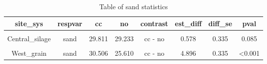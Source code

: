 \documentclass[
]{article}
\begin{document}
\begin{table}[H]

\caption{\label{tab:texture2}Table of sand statistics}
\centering
\begin{tabular}[t]{cccccccc}
\toprule
site\_sys & respvar & cc & no & contrast & est\_diff & diff\_se & pval\\
\midrule
\cellcolor{gray!6}{Central\_grain} & \cellcolor{gray!6}{sand} & \cellcolor{gray!6}{32.486} & \cellcolor{gray!6}{31.600} & \cellcolor{gray!6}{cc - no} & \cellcolor{gray!6}{0.886} & \cellcolor{gray!6}{0.299} & \cellcolor{gray!6}{0.003}\\
Central\_silage & sand & 29.811 & 29.233 & cc - no & 0.578 & 0.335 & 0.085\\
\cellcolor{gray!6}{East\_grain} & \cellcolor{gray!6}{sand} & \cellcolor{gray!6}{12.715} & \cellcolor{gray!6}{9.837} & \cellcolor{gray!6}{cc - no} & \cellcolor{gray!6}{2.877} & \cellcolor{gray!6}{0.335} & \cellcolor{gray!6}{<0.001}\\
West\_grain & sand & 30.506 & 25.610 & cc - no & 4.896 & 0.335 & <0.001\\
\bottomrule
\end{tabular}
\end{table}
\end{document}
